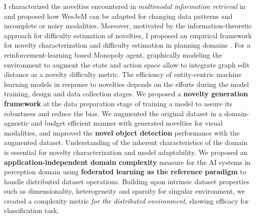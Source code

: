 %
I characterized the novelties encountered in \textit{multimodal information retrieval} in \cite{solaiman2022open} and proposed how WesJeM can be adapted for changing data patterns and incomplete or noisy modalities.
Moreover, motivated by the information-theoretic approach for difficulty estimation of novelties, I proposed an empirical framework for novelty characterization and difficulty estimation in planning domains \cite{solaiman2022measurement}. For a reinforcement-learning based Monopoly agent, graphically modeling the environment to augment the state and action space allow to integrate graph edit distance as a novelty difficulty metric.
%
The efficiency of entity-centric machine learning models in response to novelties depends on the efforts during the model training, design and data collection stages. We proposed a \textbf{novelty generation framework} \cite{nesen2021dataset} at
the data preparation stage of training a model to assure its robustness and reduce the bias. We augmented the original dataset in a domain-agnostic
and budget efficient manner with generated novelties for visual modalities, %
and improved the \textbf{novel object detection} performance with the augmented dataset.
%
%
Understanding of the inherent characteristics of the domain is essential for novelty characterization and model adaptability. %
We proposed an \textbf{application-independent domain complexity} measure for the AI systems in perception domain \cite{solaiman2023domainComplexity} using \textbf{federated learning as the reference paradigm} to handle distributed dataset operations.
Building upon intrinsic dataset properties such as dimensionality, heterogeneity and sparsity for singular environment, we created a complexity metric \textit{for the distributed environment}, showing efficacy for classification task. 
